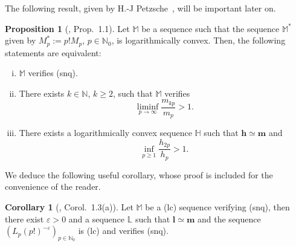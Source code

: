 \documentclass[11pt,a4paper]{article}
\theoremstyle{definition}
\newtheorem{pro}[theo]{Proposition}
\newtheorem{cor}[theo]{Corollary}
\newenvironment{coro}{\smallskip\begin{cor}}{\end{cor}\smallskip}
\def\oo{\infty}
\def\ri{\rightarrow}
\def\b{\beta}
\def\ep{\varepsilon}
\def\N{\mathbb{N}}
\def\M{\mathbb{M}}
\def\m{\boldsymbol{m}}
\def\h{\boldsymbol{h}}
\def\l{\boldsymbol{l}}%
\begin{document}
The following result, given by H.-J Petzsche~\cite{Pet}, will be important later on.

\begin{pro}[\cite{Pet}, Prop.\ 1.1]\label{petzche11}
 Let $\M$ be a sequence such that the sequence $\M^*$ given by $M^*_p:=p!M_p$, $p\in\N_0$, is logarithmically convex. Then,
 the following statements are equivalent:
 \begin{enumerate}[(i)]
 \item $\M$ verifies (snq).
 \item There exists $k\in\N$, $k\ge 2$, such that $\M$ verifies
 \begin{equation}\label{condition.liminf.mkp.over.mp.great.1}
  \liminf_{p\ri\oo} \frac{m_{kp}}{m_p}>1.
 \end{equation}
 \item There exists a logarithmically convex sequence $\mathbb{H}$ such that $\h\simeq \m$ and
 \begin{equation}\label{condition.m2p.over.mp.great.1}
  \inf_{p\geq1} \frac{h_{2p}}{h_p}>1.
 \end{equation}

 \end{enumerate}
\end{pro}




We deduce the following useful corollary, whose proof is included for the convenience of the reader.

\begin{coro}[\cite{Pet}, Corol.\ 1.3(a)] \label{petzche13}
 Let $\M$ be a (lc) sequence verifying (snq), then there exist $\ep>0$ and a sequence $\mathbb{L}$ such that $\l\simeq\m$ and
 the sequence $(L_p (p!)^{-\ep})_{p\in\N_0}$ is (lc) and  verifies (snq).
\end{coro}
\end{document}
